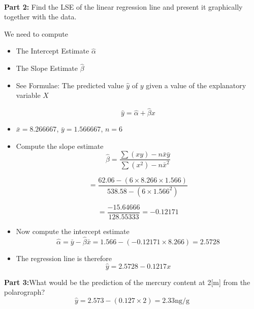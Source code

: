 \\
\bigskip
\noindent\textbf{Part 2: }Find the LSE of the linear regression line and present it graphically together with the data.

We need to compute

\begin{itemize}
	
	\item The Intercept Estimate $\hat{\alpha}$
	
	\item The Slope Estimate $\hat{\beta}$
	
	\item See Formulae: The predicted value $\hat{y} $ of $y$ given a value of the explanatory variable $X$
	
	\[\hat{y} = \hat{\alpha} + \hat{\beta}x \]
	
	
	
	\item  $\bar{x} = 8.266667$, $\bar{y} = 1.566667$, $n =6$
	
	\item Compute the slope estimate
	\[\hat{\beta} =  \frac{\sum(xy) - n\bar{x} \bar{y} }{\sum(x^2) - n\bar{x}^2 }\]
	
	\[= \frac{62.06 - (6 \times 8.266 \times 1.566) }{538.58  - (6 \times 1.566^2) }\]
	
	\[= \frac{-15.64666}{128.55333} = -0.12171\]
	
	
	\item Now compute the intercept estimate \[ \hat{\alpha} = \bar{y} - \hat{\beta}\bar{x} = 1.566-(-0.12171 \times 8.266) = 2.5728\]
	\item The regression line is therefore \[\hat{y} = 2.5728 - 0.1217x \]
\end{itemize}




\noindent\textbf{Part 3:}What would be the prediction of the mercury content at 2[m] from the polarograph?
\bigskip
\[ \hat{y} = 2.573 - (0.127 \times 2) = 2.33 \mbox{ng/g}  \]

